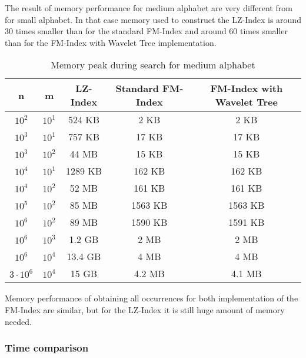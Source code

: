 The result of memory performance for medium alphabet are very different from for small alphabet. In that case memory used to construct the LZ-Index is around $30$ times smaller than for the standard FM-Index and around $60$ times smaller than for the FM-Index with Wavelet Tree implementation. 

\begin{table}[H]
\begin{center}
\caption{Memory peak during search for medium alphabet}
\begin{tabular}{|c|c|c|c|c|}
\hline
\rowcolor[HTML]{C0C0C0}
n & m & LZ-Index & Standard FM-Index & FM-Index with Wavelet Tree \\ \hline
$10^{2}$ & $10^{1}$ & 524 KB & 2 KB & 2 KB \\ \hline
$10^{3}$ & $10^{1}$ & 757 KB & 17 KB & 17 KB \\ \hline
$10^{3}$ & $10^{2}$ & 44 MB & 15 KB & 15 KB \\ \hline
$10^{4}$ & $10^{1}$ & 1289 KB & 162 KB & 162 KB \\ \hline
$10^{4}$ & $10^{2}$ & 52 MB & 161 KB & 161 KB \\ \hline
$10^{5}$ & $10^{2}$ & 85 MB & 1563 KB & 1563 KB \\ \hline
$10^{6}$ & $10^{2}$ & 89 MB & 1590 KB & 1591 KB \\ \hline
$10^{6}$ & $10^{3}$ & 1.2 GB & 2 MB & 2 MB \\ \hline
$10^{6}$ & $10^{4}$ & 13.4 GB & 4 MB & 4 MB \\ \hline
$3 \cdot 10^{6}$ & $10^{4}$ & 15 GB & 4.2 MB & 4.1 MB \\ \hline
\end{tabular}
\end{center}
\end{table}

Memory performance of obtaining all occurrences for both implementation of the FM-Index are similar, but for the LZ-Index it is still huge amount of memory needed.  

\subsubsection{Time comparison}

